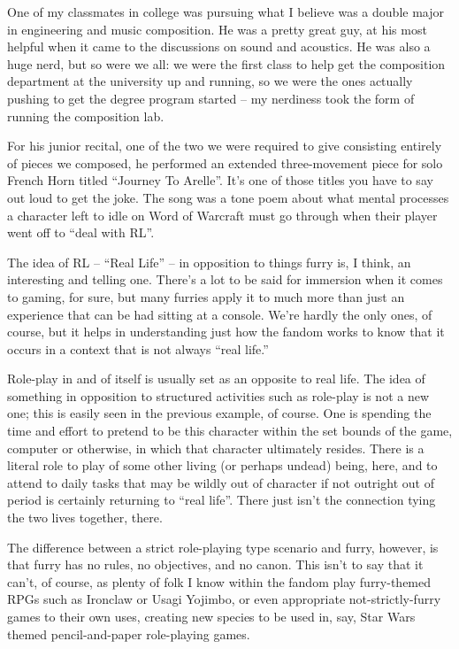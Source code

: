 
One of my classmates in college was pursuing what I believe was a double major in engineering and music composition. He was a pretty great guy, at his most helpful when it came to the discussions on sound and acoustics. He was also a huge nerd, but so were we all: we were the first class to help get the composition department at the university up and running, so we were the ones actually pushing to get the degree program started -- my nerdiness took the form of running the composition lab.

For his junior recital, one of the two we were required to give consisting entirely of pieces we composed, he performed an extended three-movement piece for solo French Horn titled ``Journey To Arelle''. It's one of those titles you have to say out loud to get the joke. The song was a tone poem about what mental processes a character left to idle on Word of Warcraft must go through when their player went off to ``deal with RL''.

The idea of RL -- ``Real Life'' -- in opposition to things furry is, I think, an interesting and telling one. There's a lot to be said for immersion when it comes to gaming, for sure, but many furries apply it to much more than just an experience that can be had sitting at a console. We're hardly the only ones, of course, but it helps in understanding just how the fandom works to know that it occurs in a context that is not always ``real life.''

Role-play in and of itself is usually set as an opposite to real life. The idea of something in opposition to structured activities such as role-play is not a new one; this is easily seen in the previous example, of course. One is spending the time and effort to pretend to be this character within the set bounds of the game, computer or otherwise, in which that character ultimately resides. There is a literal role to play of some other living (or perhaps undead) being, here, and to attend to daily tasks that may be wildly out of character if not outright out of period is certainly returning to ``real life''. There just isn't the connection tying the two lives together, there.

The difference between a strict role-playing type scenario and furry, however, is that furry has no rules, no objectives, and no canon. This isn't to say that it can't, of course, as plenty of folk I know within the fandom play furry-themed RPGs such as Ironclaw or Usagi Yojimbo, or even appropriate not-strictly-furry games to their own uses, creating new species to be used in, say, Star Wars themed pencil-and-paper role-playing games.

